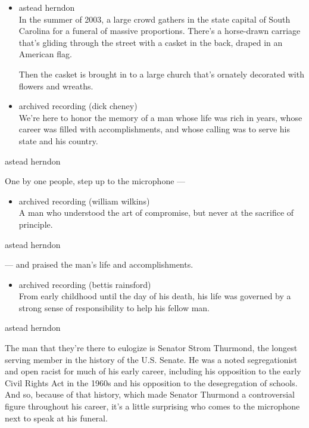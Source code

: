 \begin{itemize}
\item
  astead herndon\\
  In the summer of 2003, a large crowd gathers in the state capital of
  South Carolina for a funeral of massive proportions. There's a
  horse-drawn carriage that's gliding through the street with a casket
  in the back, draped in an American flag.

  Then the casket is brought in to a large church that's ornately
  decorated with flowers and wreaths.
\item
  archived recording (dick cheney)\\
  We're here to honor the memory of a man whose life was rich in years,
  whose career was filled with accomplishments, and whose calling was to
  serve his state and his country.
\end{itemize}

astead herndon

One by one people, step up to the microphone ---

\begin{itemize}
\tightlist
\item
  archived recording (william wilkins)\\
  A man who understood the art of compromise, but never at the sacrifice
  of principle.
\end{itemize}

astead herndon

--- and praised the man's life and accomplishments.

\begin{itemize}
\tightlist
\item
  archived recording (bettis rainsford)\\
  From early childhood until the day of his death, his life was governed
  by a strong sense of responsibility to help his fellow man.
\end{itemize}

astead herndon

The man that they're there to eulogize is Senator Strom Thurmond, the
longest serving member in the history of the U.S. Senate. He was a noted
segregationist and open racist for much of his early career, including
his opposition to the early Civil Rights Act in the 1960s and his
opposition to the desegregation of schools. And so, because of that
history, which made Senator Thurmond a controversial figure throughout
his career, it's a little surprising who comes to the microphone next to
speak at his funeral.

